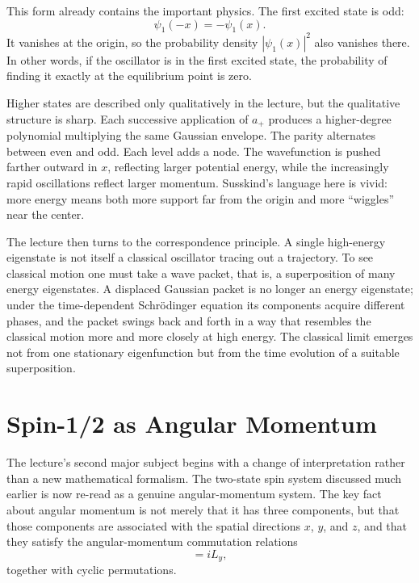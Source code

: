 This form already contains the important physics. The first excited state is odd:
\[
\psi_{1}(-x)=-\psi_{1}(x).
\]
It vanishes at the origin, so the probability density \(|\psi_{1}(x)|^{2}\) also vanishes there. In other words, if the oscillator is in the first excited state, the probability of finding it exactly at the equilibrium point is zero.

Higher states are described only qualitatively in the lecture, but the qualitative structure is sharp. Each successive application of \(a_{+}\) produces a higher-degree polynomial multiplying the same Gaussian envelope. The parity alternates between even and odd. Each level adds a node. The wavefunction is pushed farther outward in \(x\), reflecting larger potential energy, while the increasingly rapid oscillations reflect larger momentum. Susskind's language here is vivid: more energy means both more support far from the origin and more ``wiggles'' near the center.

The lecture then turns to the correspondence principle. A single high-energy eigenstate is not itself a classical oscillator tracing out a trajectory. To see classical motion one must take a wave packet, that is, a superposition of many energy eigenstates. A displaced Gaussian packet is no longer an energy eigenstate; under the time-dependent Schr\"odinger equation its components acquire different phases, and the packet swings back and forth in a way that resembles the classical motion more and more closely at high energy. The classical limit emerges not from one stationary eigenfunction but from the time evolution of a suitable superposition.

\section{Spin-1/2 as Angular Momentum}

The lecture's second major subject begins with a change of interpretation rather than a new mathematical formalism. The two-state spin system discussed much earlier is now re-read as a genuine angular-momentum system. The key fact about angular momentum is not merely that it has three components, but that those components are associated with the spatial directions \(x\), \(y\), and \(z\), and that they satisfy the angular-momentum commutation relations
\begin{equation}
[L_{z},L_{x}]=iL_{y},
\end{equation}
together with cyclic permutations.

